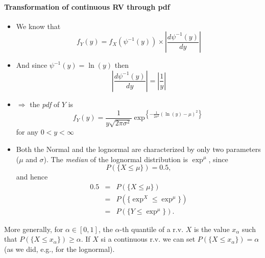 \documentclass[notes=show,smaller,handout]{beamer}\usepackage[]{graphicx}\usepackage[]{color}
\renewcommand{\Pr}{P}
\newenvironment{stepitemize}{\begin{itemize}[<+->]}{\end{itemize} }
\begin{document}
\begin{frame}{\secname}
  \framesubtitle{Transformation of continuous RV through pdf }
  \begin{example}[continued]
  \begin{stepitemize}
  \item We know that
  \begin{equation*}
  f_{Y}\left( y\right) =f_{X}\left( \psi ^{-1}\left( y\right) \right) \times
  \left\vert \frac{d\psi ^{-1}\left( y\right) }{dy}\right\vert
  \end{equation*}

  \item And since $\psi ^{-1}\left( y\right) =\ln (y)$ then
  \begin{equation*}
  \left\vert \frac{d\psi ^{-1}\left( y\right) }{dy}\right\vert =\left\vert
  \frac{1}{y}\right\vert
  \end{equation*}

  \item $\Rightarrow $ the \emph{pdf} of $Y$ is
  \begin{equation*}
  f_{Y}\left( y\right) =\frac{1}{y\sqrt{2\pi \sigma ^{2}}}\exp^{ \left\{ -\frac{1%
  }{2\sigma ^{2}}\left( \ln (y)-\mu \right) ^{2}\right\}}
  \end{equation*}
  for any $0<y<\infty $
  \end{stepitemize}
  \end{example}
\end{frame}

\begin{frame}{\secname}
  \begin{example}[continued]
  \begin{stepitemize}
  \item Both the Normal and the lognormal are characterized by
  only two parameters ($\mu$ and $\sigma$). The \emph{median} of the lognormal distribution is $\exp^{
  \mu } $, since $$
  \Pr \left( \{ X\leq \mu \} \right) = 0.5,
  $$
  and hence%
  \begin{eqnarray*}
  0.5 &=&\Pr \left(\{ X\leq \mu \}\right) \\
  &=&\Pr \left( \{\exp^{X} \leq \exp^{ \mu }\} \right) \\
  &=&\Pr \left( \{Y\leq \exp^{ \mu }\} \right).
  \end{eqnarray*}
  \end{stepitemize}
  \end{example}
  More generally, for $\alpha\in[0,1]$, the $\alpha$-th quantile of a r.v. $X$ is the value $x_\alpha$ such that $P(\{X \leq x_\alpha\})\geq\alpha$. If $X$ si a continuous r.v.  we can set $P(\{X \leq x_\alpha\})=\alpha$ (as we did, e.g., for the lognormal).
\end{frame}
\end{document}
